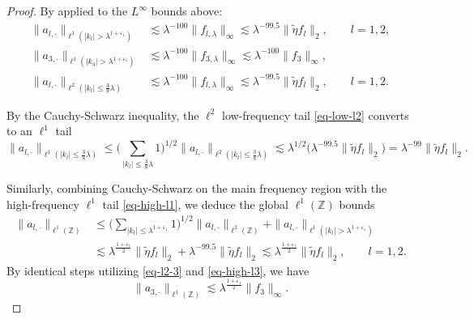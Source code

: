 \documentclass[11pt]{amsart}
\begin{document}
\begin{proof}
	By \cite[Lemma~4.1]{bhojak2025alternate} applied to the $L^\infty$ bounds above:
	\begin{align}
		\|a_{l, \cdot} \|_{\ell^1(|k_l| > \lambda^{1+\varepsilon_1})} &\lesssim \lambda^{-100}\|f_{l,\lambda}\|_\infty \lesssim \lambda^{-99.5}\|\widetilde\eta f_l\|_2, \qquad l = 1, 2, \label{eq-high-l1} \\
		\|a_{3, \cdot} \|_{\ell^1(|k_3| > \lambda^{1+\varepsilon_1})} &\lesssim \lambda^{-100}\|f_{3,\lambda}\|_\infty \lesssim \lambda^{-100}\|f_3\|_\infty, \label{eq-high-l3} \\
		\|a_{l, \cdot} \|_{\ell^2(|k_l| \le \frac{3}{8}\lambda)} &\lesssim \lambda^{-100}\|f_{l,\lambda}\|_\infty \lesssim \lambda^{-99.5}\|\widetilde\eta f_l\|_2, \qquad l = 1, 2. \label{eq-low-l2}
	\end{align}
	
	By the Cauchy-Schwarz inequality, the $\ell^2$ low-frequency tail \eqref{eq-low-l2} converts to an $\ell^1$ tail
	\begin{equation}\label{eq-low-l1}
		\|a_{l, \cdot} \|_{\ell^1(|k_l| \le \frac{3}{8}\lambda)} \le \Big(\sum_{|k_l| \le \frac{3}{8}\lambda} 1\Big)^{1/2} \|a_{l, \cdot} \|_{\ell^2(|k_l| \le \frac{3}{8}\lambda)} \lesssim \lambda^{1/2} \big( \lambda^{-99.5}\|\widetilde\eta f_l\|_2 \big) = \lambda^{-99}\|\widetilde\eta f_l\|_2.
	\end{equation}
	
	Similarly, combining Cauchy-Schwarz on the main frequency region with the high-frequency $\ell^1$ tail \eqref{eq-high-l1}, we deduce the global $\ell^1(\mathbb Z)$ bounds
	\begin{align}
		\|a_{l, \cdot}\|_{\ell^1(\mathbb{Z})} &\le \Big(\sum_{|k_l| \le \lambda^{1+\varepsilon_1}} 1\Big)^{1/2} \|a_{l,\cdot}\|_{\ell^2(\mathbb{Z})} + \|a_{l, \cdot}\|_{\ell^1(|k_l| > \lambda^{1+\varepsilon_1})} \nonumber \\
		&\lesssim \lambda^{\frac{1+\varepsilon_1}{2}} \|\widetilde\eta f_l\|_2 + \lambda^{-99.5}\|\widetilde\eta f_l\|_2 \lesssim \lambda^{\frac{1+\varepsilon_1}{2}} \|\widetilde\eta f_l\|_2, \qquad l=1,2. \label{eq-global-l1-12}
	\end{align}
	By identical steps utilizing \eqref{eq-l2-3} and \eqref{eq-high-l3}, we have
	\begin{equation}\label{eq-global-l1-3}
		\|a_{3, \cdot}\|_{\ell^1(\mathbb{Z})} \lesssim \lambda^{\frac{1+\varepsilon_1}{2}} \|f_3\|_\infty.
	\end{equation}
	

\end{proof}
\end{document}
